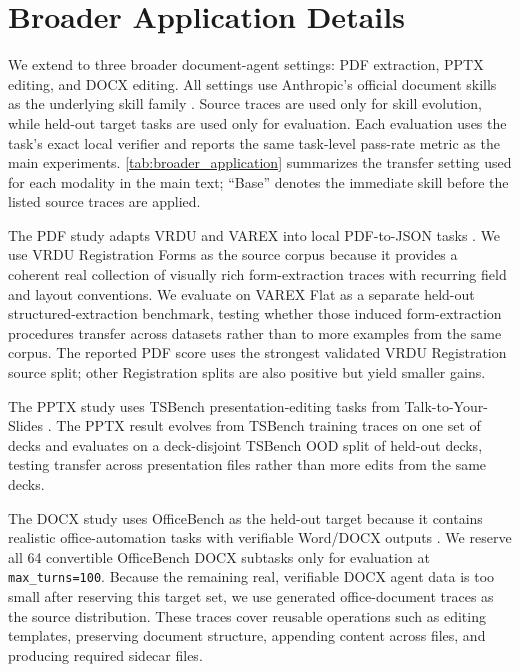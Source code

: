 \section{Broader Application Details}
\label{app:broader_application}

We extend \systemname{} to three broader document-agent settings: PDF extraction, PPTX editing, and DOCX editing.
All settings use Anthropic's official document skills as the underlying skill family \citep{anthropic2026documentskills}.
Source traces are used only for skill evolution, while held-out target tasks are used only for evaluation.
Each evaluation uses the task's exact local verifier and reports the same task-level pass-rate metric as the main experiments.
\cref{tab:broader_application} summarizes the transfer setting used for each modality in the main text; ``Base'' denotes the immediate skill before the listed source traces are applied.

The PDF study adapts VRDU and VAREX into local PDF-to-JSON tasks \citep{wang2023vrdu,barzelay2026varex}.
We use VRDU Registration Forms as the source corpus because it provides a coherent real collection of visually rich form-extraction traces with recurring field and layout conventions.
We evaluate on VAREX Flat as a separate held-out structured-extraction benchmark, testing whether those induced form-extraction procedures transfer across datasets rather than to more examples from the same corpus.
The reported PDF score uses the strongest validated VRDU Registration source split; other Registration splits are also positive but yield smaller gains.

The PPTX study uses TSBench presentation-editing tasks from Talk-to-Your-Slides \citep{jung2026talktoyourslides}.
The PPTX result evolves from TSBench training traces on one set of decks and evaluates on a deck-disjoint TSBench OOD split of held-out decks, testing transfer across presentation files rather than more edits from the same decks.

The DOCX study uses OfficeBench as the held-out target because it contains realistic office-automation tasks with verifiable Word/DOCX outputs \citep{wang2024officebench}.
We reserve all 64 convertible OfficeBench DOCX subtasks only for evaluation at \texttt{max\_turns=100}.
Because the remaining real, verifiable DOCX agent data is too small after reserving this target set, we use generated office-document traces as the source distribution.
These traces cover reusable operations such as editing templates, preserving document structure, appending content across files, and producing required sidecar files.

